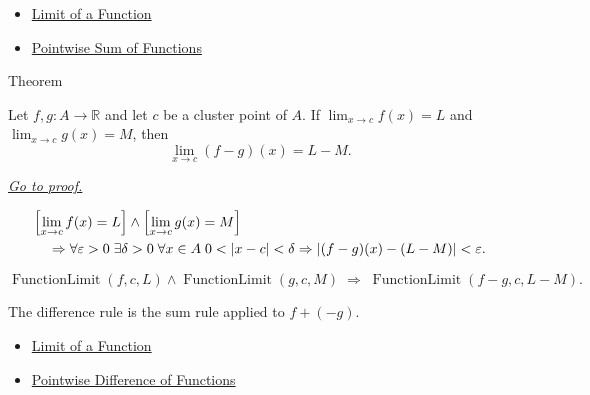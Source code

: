 \begin{dependencies}
\begin{itemize}
  \item \hyperref[def:limit-function]{Limit of a Function}
  \item \hyperref[def:pointwise-sum-of-functions]{Pointwise Sum of Functions}
\end{itemize}
\end{dependencies}


\begin{theorembox}{Theorem}
\begin{theorem}
\label{thm:limit-difference}
Let $f,g:A\to\mathbb{R}$ and let $c$ be a cluster point of $A$. If
$\lim_{x\to c}f(x)=L$ and $\lim_{x\to c}g(x)=M$, then
\[
  \lim_{x\to c}(f-g)(x)=L-M.
\]

\smallskip\noindent
\hyperref[prf:limit-difference]{\textit{Go to proof.}}
\end{theorem}
\end{theorembox}

\begin{remark*}
\[
\begin{aligned}
&\Bigl[\lim_{x\to c}f(x)=L\Bigr]\wedge\Bigl[\lim_{x\to c}g(x)=M\Bigr] \\
&\quad\Rightarrow
\forall\varepsilon>0\;\exists\delta>0\;\forall x\in A\;
0<|x-c|<\delta\Rightarrow |(f-g)(x)-(L-M)|<\varepsilon.
\end{aligned}
\]
\end{remark*}

\begin{remark*}
\[
  \operatorname{FunctionLimit}(f,c,L)\wedge\operatorname{FunctionLimit}(g,c,M)
  \;\Longrightarrow\;
  \operatorname{FunctionLimit}(f-g,c,L-M).
\]
\end{remark*}

\begin{remark*}[Interpretation]
The difference rule is the sum rule applied to $f+(-g)$.
\end{remark*}

\begin{dependencies}
\begin{itemize}
  \item \hyperref[def:limit-function]{Limit of a Function}
  \item \hyperref[def:pointwise-difference-of-functions]{Pointwise Difference of Functions}
\end{itemize}
\end{dependencies}

